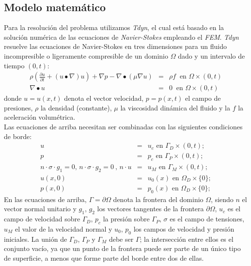 \documentclass[10pt,a4paper,final]{article}
\begin{document}
\subsection{Modelo matemático}
Para la resolución del problema utilizamos \emph{Tdyn}, el cual está basado en la solución numérica de las ecuaciones de \emph{Navier-Stokes} empleando el \emph{FEM}.
\emph{Tdyn} resuelve las ecuaciones de Navier-Stokes en tres dimensiones para un fluido incompresible o ligeramente compresible de un dominio $\Omega$ dado y un intervalo de tiempo $(0,t):$
\begin{eqnarray}
\rho \left(\frac{\partial u}{\partial t}+\left( u \bullet  \nabla \right)u \right)+ \nabla p - \nabla \bullet(\mu \nabla u) &=& \rho f~ \mbox{ en  }\Omega \times (0,t)\\
\nabla \bullet u&=&0 ~ \mbox{ en  } \Omega \times (0,t)
\end{eqnarray}
donde $u = u(x,t)$ denota el vector velocidad, $p=p(x,t)$ el campo de presiones, $\rho$ la densidad (constante), $\mu$ la viscosidad dinámica del fluido y la $f$ la aceleración volumétrica.\\
Las ecuaciones de arriba necesitan ser combinadas con las siguientes condiciones de borde:
\begin{eqnarray}
u &=& u_c \mbox{ en  } \Gamma_D \times (0,t);\\
p &=& p_c \mbox{ en  } \Gamma_P \times (0,t);\\
n \cdot \sigma \cdot g_1=0 \mbox{, } n \cdot \sigma \cdot g_2=0~ \mbox{, } n \cdot u&=&u_M \mbox{ en  } \Gamma_M \times (0,t);\\
u(x,0)&=&u_0(x) \mbox{ en  } \Omega_D \times \lbrace 0 \rbrace ;\\
p(x,0)&=&p_0(x) \mbox{ en  } \Omega_D \times \lbrace 0 \rbrace ;
\end{eqnarray}
En las ecuaciones de arriba, $\Gamma = \partial \Omega$ denota la frontera del dominio $\Omega$, siendo $n$ el vector normal unitario y $g_1$, $g_2$ los vectores tangentes de la frontera $\partial \Omega$, $u_c$ es el campo de velocidad sobre $\Gamma_D$, $p_c$ la presión sobre $\Gamma_P$, $\sigma$ es el campo de tensiones, $u_M$ el valor de la velocidad normal y $u_0$, $p_0$ los campos de velocidad y presión iniciales. La unión de $\Gamma_D$, $\Gamma_P$ y $\Gamma_M$ debe ser $\Gamma$; la intersección entre ellos es el conjunto vacío, ya que un punto de la frontera puede ser parte de un único tipo de superficie, a menos que forme parte del borde entre dos de ellas.
\end{document}

